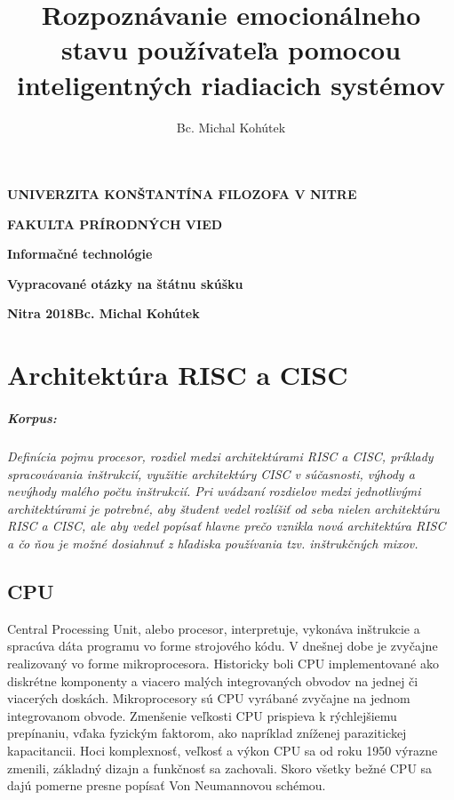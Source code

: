 \documentclass[11pt,a4paper]{report}
\author{Bc. Michal Kohútek}
\title{Rozpoznávanie emocionálneho stavu používateľa pomocou inteligentných 
riadiacich systémov}
\begin{document}
\begin{titlepage}
	
{\centering
{\bfseries\LARGE UNIVERZITA KONŠTANTÍNA FILOZOFA V NITRE \par}
{\bfseries\LARGE FAKULTA PRÍRODNÝCH VIED \par}
\vfill
{\bfseries\LARGE Informačné technológie\par}
\vspace{1cm}
{\bfseries\Large Vypracované otázky na štátnu skúšku\par}
\par}
\vfill


\Large{\noindent\textbf{Nitra 2018}\hfill\textbf{Bc. Michal Kohútek}}
\end{titlepage}

\tableofcontents

\chapter{Architektúra RISC a CISC}
\setcounter{page}{2}
\pagestyle{scrplain}

\paragraph{Korpus:} \textit{Definícia pojmu procesor, rozdiel medzi architektúrami RISC a CISC, príklady spracovávania inštrukcií, využitie architektúry CISC v súčasnosti, výhody a nevýhody malého počtu inštrukcií. Pri uvádzaní rozdielov medzi jednotlivými architektúrami je potrebné, aby študent vedel rozlíšiť od seba nielen architektúru RISC a CISC, ale aby vedel popísať hlavne prečo vznikla nová architektúra RISC a čo ňou je možné dosiahnuť z hľadiska používania tzv. inštrukčných mixov.}

\section{CPU} Central Processing Unit, alebo procesor, interpretuje, vykonáva inštrukcie a spracúva dáta programu vo forme strojového kódu. V dnešnej dobe je zvyčajne realizovaný vo forme mikroprocesora. Historicky boli CPU implementované ako diskrétne komponenty a viacero malých integrovaných obvodov na jednej či viacerých doskách. Mikroprocesory sú CPU vyrábané zvyčajne na jednom integrovanom obvode. Zmenšenie veľkosti CPU prispieva k rýchlejšiemu prepínaniu, vďaka fyzickým faktorom, ako napríklad zníženej parazitickej kapacitancii. Hoci komplexnosť, veľkosť a výkon CPU sa od roku 1950 výrazne zmenili, základný dizajn a funkčnosť sa zachovali. Skoro všetky bežné CPU sa dajú pomerne presne popísať Von Neumannovou schémou.
\end{document}
